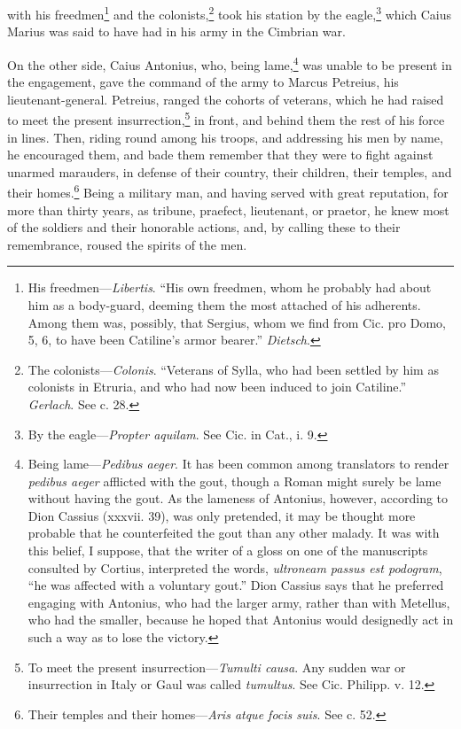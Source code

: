 with his freedmen\footnote{His freedmen—\emph{Libertis}. ``His own freedmen, whom he probably
had about him as a body-guard, deeming them the most attached of his
adherents. Among them was, possibly, that Sergius, whom we find
from Cic. pro Domo, 5, 6, to have been Catiline's armor bearer.''
\emph{Dietsch}.} and the colonists,\footnote{The colonists—\emph{Colonis}. ``Veterans of Sylla, who had been
settled by him as colonists in Etruria, and who had now been induced
to join Catiline.'' \emph{Gerlach}. See c. 28.} took his station by the
eagle,\footnote{By the eagle—\emph{Propter aquilam}. See Cic. in Cat., i. 9.} which Caius Marius was said to have had in his army in the
Cimbrian war.

On the other side, Caius Antonius, who, being lame,\footnote{Being lame—\emph{Pedibus aeger}. It has been common among
translators to render \emph{pedibus aeger} afflicted with the gout, though
a Roman might surely be lame without having the gout. As the lameness
of Antonius, however, according to Dion Cassius (xxxvii. 39), was only
pretended, it may be thought more probable that he counterfeited the
gout than any other malady. It was with this belief, I suppose, that
the writer of a gloss on one of the manuscripts consulted by Cortius,
interpreted the words, \emph{ultroneam passus est podogram}, ``he was
affected with a voluntary gout.'' Dion Cassius says that he preferred
engaging with Antonius, who had the larger army, rather than with
Metellus, who had the smaller, because he hoped that Antonius would
designedly act in such a way as to lose the victory.} was unable to
be present in the engagement, gave the command of the army to Marcus
Petreius, his lieutenant-general. Petreius, ranged the cohorts of
veterans, which he had raised to meet the present insurrection,\footnote{To meet the present insurrection—\emph{Tumulti causa}. Any sudden
war or insurrection in Italy or Gaul was called \emph{tumultus}. See
Cic. Philipp. v. 12.}
in front, and behind them the rest of his force in lines. Then, riding
round among his troops, and addressing his men by name, he encouraged
them, and bade them remember that they were to fight against unarmed
marauders, in defense of their country, their children, their temples,
and their homes.\footnote{Their temples and their homes—\emph{Aris atque focis suis}. See
c. 52.} Being a military man, and having served with
great reputation, for more than thirty years, as tribune, praefect,
lieutenant, or praetor, he knew most of the soldiers and their
honorable actions, and, by calling these to their remembrance, roused
the spirits of the men.

